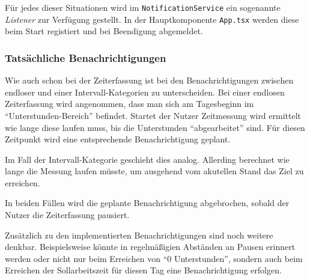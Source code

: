\noindent
Für jedes dieser Situationen wird im \texttt{NotificationService} ein sogenannte \emph{Listener} zur Verfügung gestellt.
In der Hauptkomponente \texttt{App.tsx} werden diese beim Start registiert und bei Beendigung abgemeldet.

\subsubsection{Tatsächliche Benachrichtigungen}
Wie auch schon bei der Zeiterfassung ist bei den Benachrichtigungen zwischen endloser und einer Intervall-Kategorien zu unterscheiden.
Bei einer endlosen Zeiterfassung wird angenommen,
dass man sich am Tagesbeginn im \enquote{Unterstunden-Bereich} befindet.
Startet der Nutzer Zeitmessung wird ermittelt wie lange diese laufen muss,
bis die Unterstunden \enquote{abgearbeitet} sind.
Für diesen Zeitpunkt wird eine entsprechende Benachrichtigung geplant.

Im Fall der Intervall-Kategorie geschieht dies analog.
Allerding berechnet wie lange die Messung laufen müsste,
um ausgehend vom akutellen Stand das Ziel zu erreichen.

In beiden Fällen wird die geplante Benachrichtigung abgebrochen,
sobald der Nutzer die Zeiterfassung pausiert.

Zusätzlich zu den implementierten Benachrichtigungen sind noch weitere denkbar.
Beispielsweise könnte in regelmäßigien Abständen an Pausen erinnert werden
oder nicht nur beim Erreichen von \enquote{0 Unterstunden},
sondern auch beim Erreichen der Sollarbeitszeit für diesen Tag eine Benachrichtigung erfolgen.

